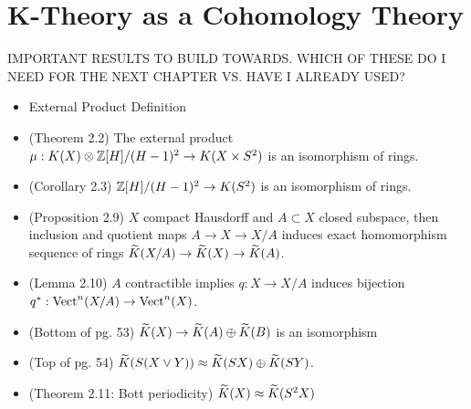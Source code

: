 \documentclass[../sean_thesis.tex]{subfiles}
\begin{document}
\chapter{K-Theory as a Cohomology Theory}

IMPORTANT RESULTS TO BUILD TOWARDS. WHICH OF THESE DO I NEED FOR THE NEXT CHAPTER VS. HAVE I ALREADY USED?
\begin{itemize}

\item External Product Definition
\item (Theorem 2.2) The external product $\mu: K(X) \otimes \mathbb{Z} [H]/(H-1)^2 \to K(X \times S^2)$ is an isomorphism of rings.
\item (Corollary 2.3) $\mathbb{Z}[H]/(H-1)^2 \to K(S^2)$ is an isomorphism of rings.
\item (Proposition 2.9) $X$ compact Hausdorff and $A \subset X$ closed subspace, then inclusion and quotient maps $A \to X \to X/A$ induces exact homomorphism sequence of rings $\widetilde{K}(X/A) \to \widetilde{K} (X) \to \widetilde{K}(A)$.
\item (Lemma 2.10) $A$ contractible implies $q: X \to X/A$ induces bijection $q^*: \operatorname{Vect}^n(X/A) \to \operatorname{Vect}^n(X)$.
\item (Bottom of pg. 53) $\widetilde{K}(X) \to \widetilde{K}(A) \oplus \widetilde{K}(B)$ is an isomorphism
\item (Top of pg. 54) $\widetilde{K}(S(X \vee Y)) \approx \widetilde{K}(SX) \oplus \widetilde{K}(SY)$.
\item (Theorem 2.11: Bott periodicity) $\widetilde{K}(X) \approx \widetilde{K}(S^2X)$
\end{itemize}
\end{document}
